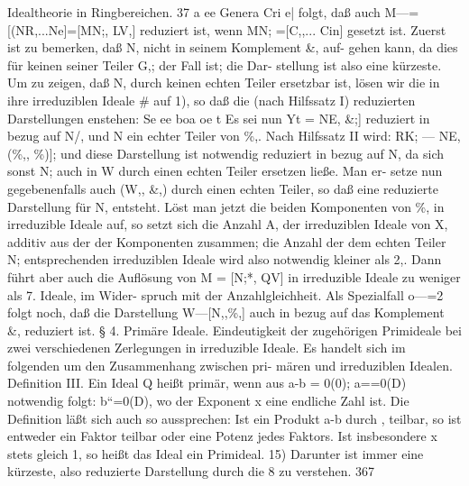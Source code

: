 \documentclass[11pt,a4paper]{article}
\theoremstyle{plain}
\theoremstyle{definition}
\begin{document}
Idealtheorie in Ringbereichen. 
37 
a ee Genera 
Cri 
e| 
folgt, 
daß 
auch 
M---=[(NR,...Ne]=[MN;, LV,] 
reduziert 
ist, 
wenn 
MN; =[C,,... Cin] gesetzt ist. 
Zuerst ist zu bemerken, daß N, nicht in seinem Komplement \&, auf- 
gehen kann, 
da dies für keinen seiner Teiler G,; der Fall ist; die Dar- 
stellung ist also eine kürzeste. 
Um zu zeigen, daß N, durch keinen echten 
Teiler ersetzbar ist, lösen wir die  in ihre irreduziblen Ideale \# auf 1\textdegree{}), 
so daß die (nach Hilfssatz I) reduzierten Darstellungen enstehen: 
Se 
ee boa 
oe 
t 
Es sei nun 
Yt = NE, \&;] reduziert in bezug auf N/, und N ein 
echter Teiler von \%,. 
Nach Hilfssatz II wird: 
RK; --- NE, (\%,, \%)]; 
und diese Darstellung ist notwendig reduziert 
in bezug auf N, da sich 
sonst N; auch in W durch einen echten Teiler ersetzen ließe. 
Man er- 
setze nun gegebenenfalls auch (W,, \&,) durch einen echten Teiler, 
so daß 
eine reduzierte Darstellung für N, entsteht. 
Löst man jetzt die beiden 
Komponenten von \%, in irreduzible Ideale auf, so setzt sich die Anzahl A, der 
irreduziblen Ideale von X, additiv aus der der Komponenten zusammen; die 
Anzahl der dem echten Teiler N; entsprechenden irreduziblen Ideale wird 
also notwendig kleiner als 2,. Dann führt aber auch die Auflösung von 
M = [N;*, QV] in irreduzible Ideale zu weniger als 7. Ideale, im Wider- 
spruch mit der Anzahlgleichheit. 
Als Spezialfall o---=2 folgt noch, daß 
die Darstellung W---[N,,\%,] 
auch 
in bezug auf das Komplement \&, 
reduziert ist. 
\S{} 4. 
Primäre Ideale. 
Eindeutigkeit der zugehörigen Primideale bei 
zwei verschiedenen Zerlegungen in irreduzible Ideale. 
Es handelt sich im folgenden um den Zusammenhang zwischen pri- 
mären und irreduziblen Idealen. 
Definition III. 
Ein Ideal Q heißt primär, wenn aus a-b = 0(0); 
a==0(D) notwendig folgt: b``=0(D), wo der Exponent x eine endliche 
Zahl ist. 
Die Definition 
läßt sich auch so aussprechen: 
Ist ein Produkt a-b 
durch , teilbar, so ist entweder ein Faktor teilbar oder eine Potenz jedes 
Faktors. 
Ist insbesondere x stets gleich 1, so heißt das Ideal ein Primideal. 
15) Darunter ist immer eine kürzeste, also reduzierte Darstellung durch die 8 
zu verstehen. 
367
\end{document}
